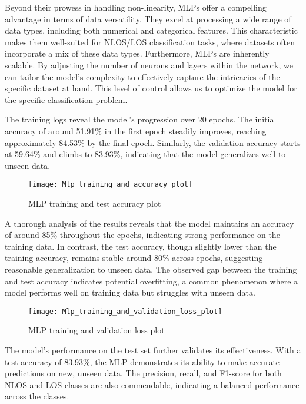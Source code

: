 \documentclass[
	a4paper, %
	11pt, %
]{CSUniSchoolLabReport}
\begin{document}
Beyond their prowess in handling non-linearity, MLPs offer a compelling advantage in terms of data versatility. They excel at processing a wide range of data types, including both numerical and categorical features. This characteristic makes them well-suited for NLOS/LOS classification tasks, where datasets often incorporate a mix of these data types. Furthermore, MLPs are inherently scalable. By adjusting the number of neurons and layers within the network, we can tailor the model's complexity to effectively capture the intricacies of the specific dataset at hand. This level of control allows us to optimize the model for the specific classification problem.

The training logs reveal the model's progression over 20 epochs. The initial accuracy of around 51.91\% in the first epoch steadily improves, reaching approximately 84.53\% by the final epoch. Similarly, the validation accuracy starts at 59.64\% and climbs to 83.93\%, indicating that the model generalizes well to unseen data. 

\begin{figure}[H] 
	\centering
	\texttt{[image: Mlp\_training\_and\_accuracy\_plot]}
	\caption{MLP training and test accuracy plot}\label{fig:frequency_graph}
\end{figure}

A thorough analysis of the results reveals that the model maintains an accuracy of around 85\% throughout the epochs, indicating strong performance on the training data. In contrast, the test accuracy, though slightly lower than the training accuracy, remains stable around 80\% across epochs, suggesting reasonable generalization to unseen data. The observed gap between the training and test accuracy indicates potential overfitting, a common phenomenon where a model performs well on training data but struggles with unseen data.


\begin{figure}[H] 
	\centering
	\texttt{[image: Mlp\_training\_and\_validation\_loss\_plot]}
	\caption{MLP training and validation loss plot}\label{fig:frequency_graph}
\end{figure}



The model's performance on the test set further validates its effectiveness. With a test accuracy of 83.93\%, the MLP demonstrates its ability to make accurate predictions on new, unseen data. The precision, recall, and F1-score for both NLOS and LOS classes are also commendable, indicating a balanced performance across the classes.
\end{document}
